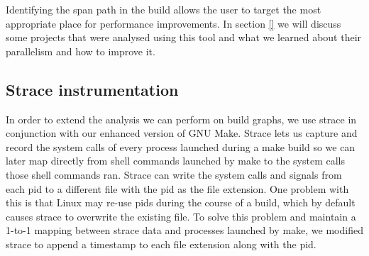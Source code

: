 \documentclass[twocolumn,acmtog,10pt,review]{acmart}
\begin{document}
Identifying the span path in the build allows the user to target the most appropriate place
for performance improvements.  In section \ref{} we will discuss some projects that were analysed
using this tool and what we learned about their parallelism and how to improve it.





\subsection{Strace instrumentation}
\label{sec:straceinstr}

In order to extend the analysis we can perform on build graphs, we use strace \cite{} in
conjunction with our enhanced version of GNU Make.  Strace lets us capture and record the system
calls of every process launched during a make build so we can later map directly from shell
commands launched by make to the system calls those shell commands ran.  Strace can write the
system calls and signals from each pid to a different file with the pid as the file extension.
One problem with this is that Linux may re-use pids during the course of a build, which by default
causes strace to overwrite the existing file.  To solve this problem and maintain a 1-to-1
mapping between strace data and processes launched by make, we modified strace to append a
timestamp to each file extension along with the pid.
\end{document}

